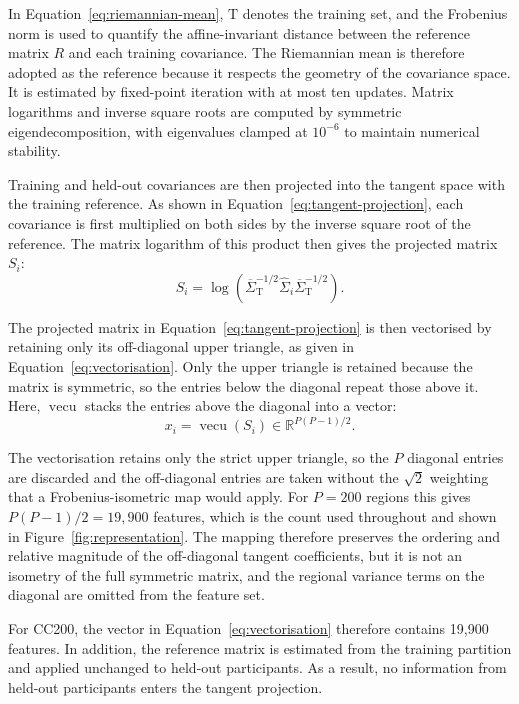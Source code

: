 In Equation~\eqref{eq:riemannian-mean}, $\mathrm{T}$ denotes the training set, and the Frobenius norm is used to quantify the affine-invariant distance between the reference matrix $R$ and each training covariance. The Riemannian mean is therefore adopted as the reference because it respects the geometry of the covariance space. It is estimated by fixed-point iteration with at most ten updates. Matrix logarithms and inverse square roots are computed by symmetric eigendecomposition, with eigenvalues clamped at $10^{-6}$ to maintain numerical stability.

Training and held-out covariances are then projected into the tangent space with the
training reference. As shown in Equation~\eqref{eq:tangent-projection}, each covariance is first multiplied
on both sides by the inverse square root of the reference. The matrix logarithm of this
product then gives the projected matrix $S_i$:
\begin{equation}
S_i
=
\log\!\left(
\overline{\Sigma}_{\mathrm{T}}^{-1/2}
\widehat{\Sigma}_i
\overline{\Sigma}_{\mathrm{T}}^{-1/2}
\right).
\label{eq:tangent-projection}
\end{equation}

The projected matrix in Equation~\eqref{eq:tangent-projection} is then vectorised by retaining only its
off-diagonal upper triangle, as given in Equation~\eqref{eq:vectorisation}. Only the upper triangle is
retained because the matrix is symmetric, so the entries below the diagonal repeat those
above it. Here, $\operatorname{vecu}$ stacks the entries above the diagonal into a vector:
\begin{equation}
x_i
=
\operatorname{vecu}(S_i)
\in
\mathbb{R}^{P(P-1)/2}.
\label{eq:vectorisation}
\end{equation}

The vectorisation retains only the strict upper triangle, so the $P$ diagonal entries are discarded and the off-diagonal entries are taken without the $\sqrt{2}$ weighting that a Frobenius-isometric map would apply. For $P=200$ regions this gives $P(P-1)/2=19{,}900$ features, which is the count used throughout and shown in Figure~\ref{fig:representation}. The mapping therefore preserves the ordering and relative magnitude of the off-diagonal tangent coefficients, but it is not an isometry of the full symmetric matrix, and the regional variance terms on the diagonal are omitted from the feature set.

For CC200, the vector in Equation~\eqref{eq:vectorisation} therefore contains 19,900 features. In
addition, the reference matrix is estimated from the training partition and applied
unchanged to held-out participants. As a result, no information from held-out
participants enters the tangent projection.


